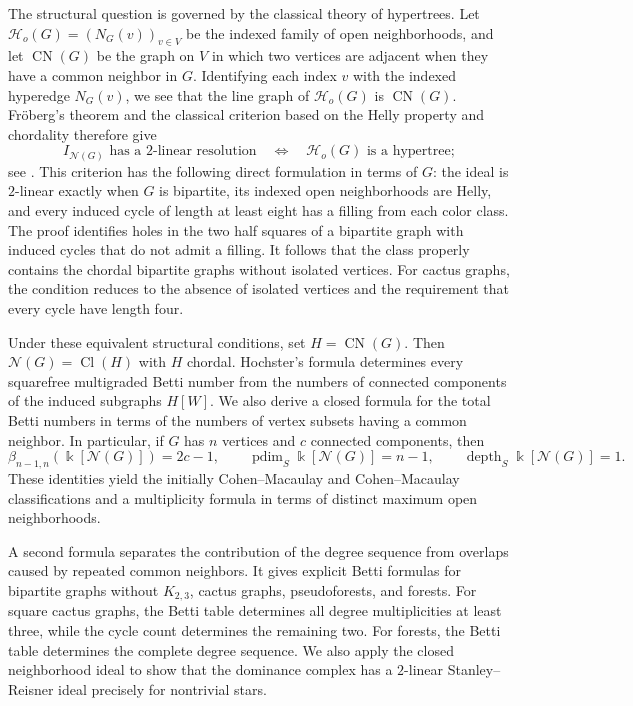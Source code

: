 \documentclass[11pt]{amsart}
\theoremstyle{definition}
\theoremstyle{remark}
\numberwithin{equation}{section}
\newcommand{\NN}{\mathcal N}
\newcommand{\Ho}{\mathcal H_{\!o}}
\newcommand{\Cl}{\operatorname{Cl}}
\newcommand{\CN}{\operatorname{CN}}
\newcommand{\pd}{\operatorname{pdim}}
\newcommand{\depth}{\operatorname{depth}}
\begin{document}
	The structural question is governed by the classical theory of hypertrees.
	Let
	\(\Ho(G)=(N_G(v))_{v\in V}\) be the indexed family of open neighborhoods,
	and let \(\CN(G)\) be the graph on \(V\) in which two vertices are adjacent
	when they have a common neighbor in \(G\). Identifying each index \(v\) with the
	indexed hyperedge \(N_G(v)\), we see that the line graph of \(\Ho(G)\) is
	\(\CN(G)\). Fr\"oberg's theorem and the classical criterion based on the Helly
	property and chordality therefore give
	\[
	I_{\NN(G)}\text{ has a \(2\)-linear resolution}
	\quad\Longleftrightarrow\quad
	\Ho(G)\text{ is a hypertree};
	\]
	see \cite{BrandstadtDraganChepoiVoloshin1998,Froberg1990}. This criterion
	has the following direct formulation in terms of \(G\): the
	ideal is \(2\)-linear exactly when \(G\) is bipartite, its indexed open
	neighborhoods are Helly, and every induced cycle of length at least eight has
	a filling from each color class. The proof identifies holes in
	the two half squares of a bipartite graph with induced cycles that do not
	admit a filling. It follows that the class properly contains the chordal bipartite 
	graphs without isolated vertices. For cactus graphs, the condition reduces to 
	the absence of isolated vertices and the requirement that every cycle have 
	length four.

	Under these equivalent structural conditions, set \(H=\CN(G)\). Then
	\(\NN(G)=\Cl(H)\) with \(H\) chordal. Hochster's
	formula determines every squarefree multigraded Betti number from the numbers
	of connected components of the induced subgraphs \(H[W]\). We also derive a
	closed formula for the total Betti numbers in terms of the numbers of vertex
	subsets having a common neighbor. In particular, if \(G\) has \(n\) vertices
	and \(c\) connected components, then
	\[
	\beta_{n-1,n}(\Bbbk[\NN(G)])=2c-1,
	\qquad
	\pd_S\Bbbk[\NN(G)]=n-1,
	\qquad
	\depth_S\Bbbk[\NN(G)]=1.
	\]
	These identities yield the initially Cohen--Macaulay and Cohen--Macaulay
	classifications and a multiplicity formula in terms of distinct maximum open
	neighborhoods.

	A second formula separates the contribution of the degree sequence from
	overlaps caused by repeated common neighbors. It gives explicit Betti
	formulas for
	bipartite graphs without \(K_{2,3}\), cactus graphs, pseudoforests, and
	forests.
	For square cactus graphs, the Betti table determines all degree
	multiplicities at least three, while the cycle count determines the remaining
	two. For forests, the Betti table determines the complete degree sequence. We
	also apply the closed neighborhood ideal to show that the dominance complex
	has a \(2\)-linear Stanley--Reisner ideal precisely for nontrivial stars.
\end{document}
